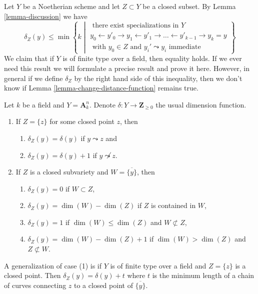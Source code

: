 \begin{remark}
\label{remark-discussion}
Let $Y$ be a Noetherian scheme and let $Z \subset Y$ be a closed subset.
By Lemma \ref{lemma-discussion} we have
$$
\delta_Z(y) \leq \min
\left\{ k \middle|
\begin{matrix}
\text{ there exist specializations in }Y \\
y_0 \leftarrow y'_0 \rightarrow y_1 \leftarrow y'_1 \rightarrow \ldots
\leftarrow y'_{k - 1} \rightarrow y_k = y \\
\text{ with }y_0 \in Z\text{ and }y_i' \leadsto y_i
\text{ immediate}
\end{matrix}
\right\}
$$
We claim that if $Y$ is of finite type over a field,
then equality holds. If we ever need this result we
will formulate a precise result and prove it here.
However, in general if we define $\delta_Z$
by the right hand side of this inequality, then we don't
know if Lemma \ref{lemma-change-distance-function} remains true.
\end{remark}

\begin{example}
\label{example-distance}
Let $k$ be a field and $Y = \mathbf{A}^n_k$. Denote
$\delta : Y \to \mathbf{Z}_{\geq 0}$ the usual dimension function.
\begin{enumerate}
\item If $Z = \{z\}$ for some closed point $z$, then
\begin{enumerate}
\item $\delta_Z(y) = \delta(y)$ if $y \leadsto z$ and
\item $\delta_Z(y) = \delta(y) + 1$ if $y \not \leadsto z$.
\end{enumerate}
\item If $Z$ is a closed subvariety and $W = \overline{\{y\}}$, then
\begin{enumerate}
\item $\delta_Z(y) = 0$ if $W \subset Z$,
\item $\delta_Z(y) = \dim(W) - \dim(Z)$ if $Z$ is contained in $W$,
\item $\delta_Z(y) = 1$ if $\dim(W) \leq \dim(Z)$ and $W \not \subset Z$,
\item $\delta_Z(y) = \dim(W) - \dim(Z) + 1$ if $\dim(W) > \dim(Z)$
and $Z \not \subset W$.
\end{enumerate}
\end{enumerate}
A generalization of case (1) is if $Y$ is of finite type over a field
and $Z = \{z\}$ is a closed point. Then $\delta_Z(y) = \delta(y) + t$
where $t$ is the minimum length of a chain of curves connecting
$z$ to a closed point of $\overline{\{y\}}$.
\end{example}







